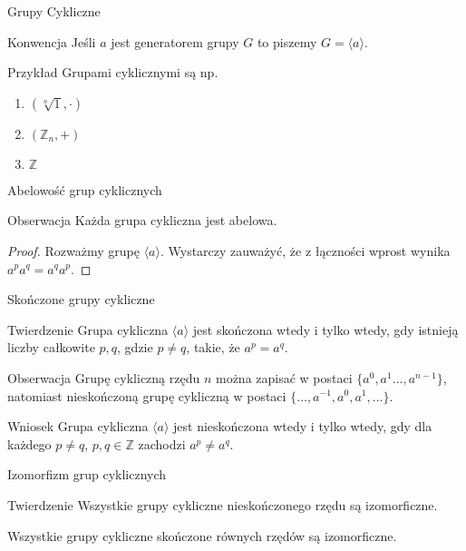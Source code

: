 \documentclass{beamer}
\begin{document}
\begin{frame}{Grupy Cykliczne}
    \begin{alertblock}{Konwencja}
        Jeśli $a$ jest generatorem grupy $G$ to piszemy $G = \langle a \rangle.$ 
    \end{alertblock}
    \begin{exampleblock}{Przykład}
        Grupami cyklicznymi są np.
        \begin{enumerate}
            \item $(\sqrt[n]{1}, \cdot)$
            \item $(\mathbb{Z}_n, +)$
            \item $\mathbb{Z}$ 
        \end{enumerate}
    \end{exampleblock}
\end{frame}

\begin{frame}{Abelowość grup cyklicznych}
    \begin{block}{Obserwacja}
        Każda grupa cykliczna jest abelowa.
    \end{block}
    \begin{proof}
        Rozważmy grupę $\langle a \rangle $. Wystarczy zauważyć, że z łączności wprost wynika $a^pa^q = a^qa^p.$
    \end{proof}
\end{frame}
    
\begin{frame}{Skończone grupy cykliczne}
    \begin{block}{Twierdzenie}
        Grupa cykliczna $\langle a \rangle$ jest skończona wtedy i tylko wtedy, gdy istnieją liczby całkowite $p,q$, gdzie 
        $p \neq q$, takie, że $a^p =a^q$.
    \end{block}
    \pause
    \begin{alertblock}{Obserwacja}
        Grupę cykliczną rzędu $n$ można zapisać w postaci $\{a^0,a^1 \ldots, a^{n-1}\}$, 
        natomiast nieskończoną grupę cykliczną w postaci $\{\ldots, a^{-1}, a^0, a^1, \ldots\}.$
    \end{alertblock}
    \begin{alertblock}{Wniosek}
        Grupa cykliczna $\langle a \rangle$ jest nieskończona wtedy i tylko wtedy, gdy dla każdego $p \neq q$, $p,q \in \mathbb{Z}$
        zachodzi $a^p \neq a^q$.
    \end{alertblock}
\end{frame}

\begin{frame}{Izomorfizm grup cyklicznych}
    \begin{block}{Twierdzenie}
        Wszystkie grupy cykliczne nieskończonego rzędu są izomorficzne.
        
        Wszystkie grupy cykliczne skończone równych rzędów są izomorficzne.
    \end{block}
\end{frame}
\end{document}
